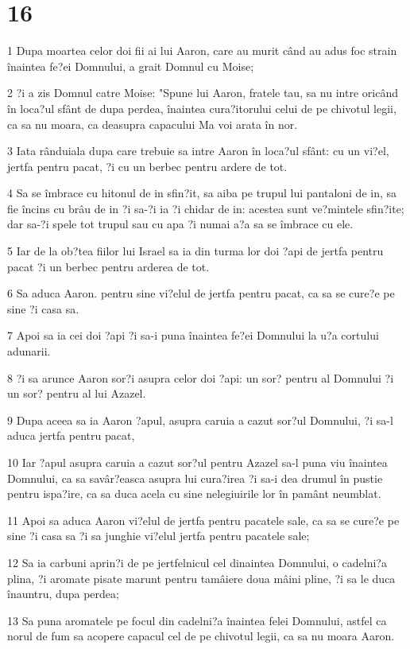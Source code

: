 \chapter{16}

\par 1 Dupa moartea celor doi fii ai lui Aaron, care au murit când au adus foc strain înaintea fe?ei Domnului, a grait Domnul cu Moise;
\par 2 ?i a zis Domnul catre Moise: "Spune lui Aaron, fratele tau, sa nu intre oricând în loca?ul sfânt de dupa perdea, înaintea cura?itorului celui de pe chivotul legii, ca sa nu moara, ca deasupra capacului Ma voi arata în nor.
\par 3 Iata rânduiala dupa care trebuie sa intre Aaron în loca?ul sfânt: cu un vi?el, jertfa pentru pacat, ?i cu un berbec pentru ardere de tot.
\par 4 Sa se îmbrace cu hitonul de in sfin?it, sa aiba pe trupul lui pantaloni de in, sa fie încins cu brâu de in ?i sa-?i ia ?i chidar de in: acestea sunt ve?mintele sfin?ite; dar sa-?i spele tot trupul sau cu apa ?i numai a?a sa se îmbrace cu ele.
\par 5 Iar de la ob?tea fiilor lui Israel sa ia din turma lor doi ?api de jertfa pentru pacat ?i un berbec pentru arderea de tot.
\par 6 Sa aduca Aaron. pentru sine vi?elul de jertfa pentru pacat, ca sa se cure?e pe sine ?i casa sa.
\par 7 Apoi sa ia cei doi ?api ?i sa-i puna înaintea fe?ei Domnului la u?a cortului adunarii.
\par 8 ?i sa arunce Aaron sor?i asupra celor doi ?api: un sor? pentru al Domnului ?i un sor? pentru al lui Azazel.
\par 9 Dupa aceea sa ia Aaron ?apul, asupra caruia a cazut sor?ul Domnului, ?i sa-l aduca jertfa pentru pacat,
\par 10 Iar ?apul asupra caruia a cazut sor?ul pentru Azazel sa-l puna viu înaintea Domnului, ca sa savâr?easca asupra lui cura?irea ?i sa-i dea drumul în pustie pentru ispa?ire, ca sa duca acela cu sine nelegiuirile lor în pamânt neumblat.
\par 11 Apoi sa aduca Aaron vi?elul de jertfa pentru pacatele sale, ca sa se cure?e pe sine ?i casa sa ?i sa junghie vi?elul jertfa pentru pacatele sale;
\par 12 Sa ia carbuni aprin?i de pe jertfelnicul cel dinaintea Domnului, o cadelni?a plina, ?i aromate pisate marunt pentru tamâiere doua mâini pline, ?i sa le duca înauntru, dupa perdea;
\par 13 Sa puna aromatele pe focul din cadelni?a înaintea felei Domnului, astfel ca norul de fum sa acopere capacul cel de pe chivotul legii, ca sa nu moara Aaron.
